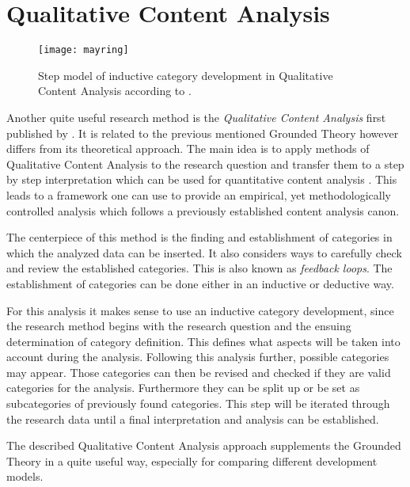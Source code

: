 
\section{Qualitative Content Analysis} %

\begin{figure}[htbp]
  \centering
  \texttt{[image: mayring]}
  \caption[Inductive Qualitative Content Analysis Process]
  {Step model of inductive category development in Qualitative Content Analysis
    according to \citeauthor{Mayring2008} \cite{Mayring2000,Mayring2008}.}
\end{figure}

Another quite useful research method is the \emph{Qualitative Content Analysis}
first published by \textcite{Mayring2008}. It is related to the previous
mentioned Grounded Theory however differs from its theoretical approach. The
main idea is to apply methods of Qualitative Content Analysis to the research
question and transfer them to a step by step interpretation which can be used
for quantitative content analysis \cite{Mayring2000}. This leads to a framework
one can use to provide an empirical, yet methodologically controlled analysis
which follows a previously established content analysis canon.

The centerpiece of this method is the finding and establishment of categories
in which the analyzed data can be inserted. It also considers ways to carefully
check and review the established categories. This is also known as
\emph{feedback loops}. The establishment of categories can be done either in an
inductive or deductive way.

For this analysis it makes sense to use an inductive category development,
since the research method begins with the research question and the ensuing
determination of category definition. This defines what aspects will be taken
into account during the analysis. Following this analysis further, possible
categories may appear. Those categories can then be revised and checked if they
are valid categories for the analysis. Furthermore they can be split up or be
set as subcategories of previously found categories. This step will be iterated
through the research data until a final interpretation and analysis can be
established.

The described Qualitative Content Analysis approach supplements the Grounded
Theory in a quite useful way, especially for comparing different development
models.

